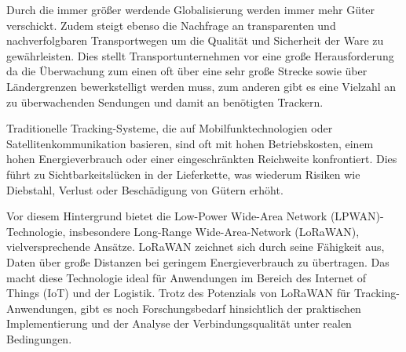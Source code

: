\label{sec:motivation_problemstellung}
Durch die immer größer werdende Globalisierung werden immer mehr Güter verschickt. Zudem steigt ebenso die Nachfrage an transparenten und nachverfolgbaren Transportwegen um die Qualität und Sicherheit der Ware zu gewährleisten. Dies stellt Transportunternehmen vor eine große Herausforderung da die Überwachung zum einen oft über eine sehr große Strecke sowie über Ländergrenzen bewerkstelligt werden muss, zum anderen gibt es eine Vielzahl an zu überwachenden Sendungen und damit an benötigten Trackern.

Traditionelle Tracking-Systeme, die auf Mobilfunktechnologien oder Satellitenkommunikation basieren, sind oft mit hohen Betriebskosten, einem hohen Energieverbrauch oder einer eingeschränkten Reichweite konfrontiert. Dies führt zu Sichtbarkeitslücken in der Lieferkette, was wiederum Risiken wie Diebstahl, Verlust oder Beschädigung von Gütern erhöht.

Vor diesem Hintergrund bietet die Low-Power Wide-Area Network (LPWAN)-Technologie, insbesondere Long-Range Wide-Area-Network (LoRaWAN), vielversprechende Ansätze. LoRaWAN zeichnet sich durch seine Fähigkeit aus, Daten über große Distanzen bei geringem Energieverbrauch zu übertragen. Das macht diese Technologie ideal für Anwendungen im Bereich des Internet of Things (IoT) und der Logistik. Trotz des Potenzials von LoRaWAN für Tracking-Anwendungen, gibt es noch Forschungsbedarf hinsichtlich der praktischen Implementierung und der Analyse der Verbindungsqualität unter realen Bedingungen.